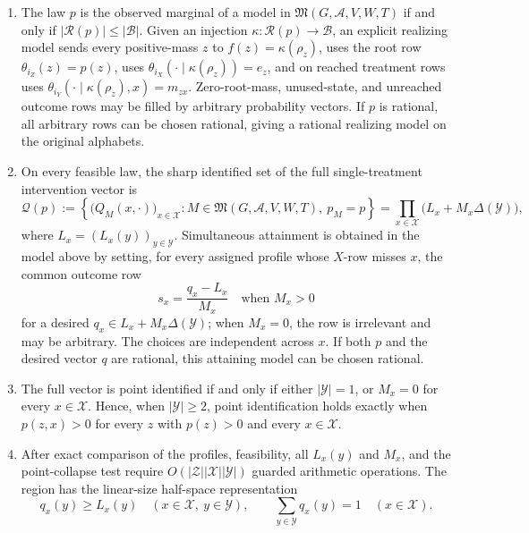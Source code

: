 \begin{enumerate}
\item The law \(p\) is the observed marginal of a model in
\(\mathfrak M(G,\mathcal A,V,W,T)\) if and only if
\(\lvert\mathcal R(p)\rvert\leq\lvert\mathcal B\rvert\).  Given an
injection \(\kappa:\mathcal R(p)\to\mathcal B\), an explicit realizing
model sends every positive-mass \(z\) to
\(f(z)=\kappa(\rho_z)\), uses the root row
\(\theta_{i_Z}(z)=p(z)\), uses
\(\theta_{i_X}(\cdot\mid\kappa(\rho_z))=e_z\), and on reached treatment
rows uses \(\theta_{i_Y}(\cdot\mid\kappa(\rho_z),x)=m_{zx}\).  Zero-root-mass,
unused-state, and unreached outcome rows may be filled by arbitrary
probability vectors.  If \(p\) is rational, all arbitrary rows can be
chosen rational, giving a rational realizing model on the original
alphabets.
\item On every feasible law, the sharp identified set of the full
single-treatment intervention vector is
\[
 \mathcal Q(p)
 :=\left\{\bigl(Q_M(x,\cdot)\bigr)_{x\in\mathcal X}:
 M\in\mathfrak M(G,\mathcal A,V,W,T),\ p_M=p\right\}
 =\prod_{x\in\mathcal X}\bigl(L_x+M_x\Delta(\mathcal Y)\bigr),
\]
where \(L_x=(L_x(y))_{y\in\mathcal Y}\).  Simultaneous attainment is
obtained in the model above by setting, for every assigned profile whose
\(X\)-row misses \(x\), the common outcome row
\[
 s_x=\frac{q_x-L_x}{M_x}\quad\text{when }M_x>0
\]
for a desired \(q_x\in L_x+M_x\Delta(\mathcal Y)\); when \(M_x=0\), the
row is irrelevant and may be arbitrary.  The choices are independent
across \(x\).  If both \(p\) and the desired vector \(q\) are rational,
this attaining model can be chosen rational.
\item The full vector is point identified if and only if either
\(\lvert\mathcal Y\rvert=1\), or \(M_x=0\) for every
\(x\in\mathcal X\).  Hence, when \(\lvert\mathcal Y\rvert\geq2\), point
identification holds exactly when \(p(z,x)>0\) for every \(z\) with
\(p(z)>0\) and every \(x\in\mathcal X\).
\item After exact comparison of the profiles, feasibility, all
\(L_x(y)\) and \(M_x\), and the point-collapse test require
\(O(\lvert\mathcal Z\rvert\lvert\mathcal X\rvert
\lvert\mathcal Y\rvert)\) guarded arithmetic operations.  The region has
the linear-size half-space representation
\[
 q_x(y)\geq L_x(y)\quad(x\in\mathcal X,\ y\in\mathcal Y),
 \qquad
 \sum_{y\in\mathcal Y}q_x(y)=1\quad(x\in\mathcal X).
\]
\end{enumerate}